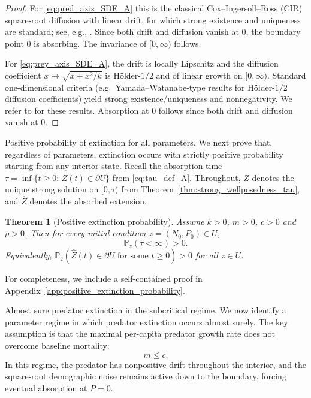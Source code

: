 \documentclass[pdflatex,sn-mathphys-ay]{sn-jnl}
\theoremstyle{thmstyleone}
\newtheorem{theorem}{Theorem}[section]
\theoremstyle{definition}
\theoremstyle{remark}
\begin{document}
\begin{proof}
For \eqref{eq:pred_axis_SDE_A} this is the classical Cox--Ingersoll--Ross (CIR) square-root diffusion with linear drift,
for which strong existence and uniqueness are standard; see, e.g.,
\citep{karatzas_brownian_1998,revuz_continuous_1999}. Since both drift and diffusion vanish at $0$,
the boundary point $0$ is absorbing. The invariance of $[0,\infty)$ follows.

For \eqref{eq:prey_axis_SDE_A}, the drift is locally Lipschitz and the diffusion coefficient $x\mapsto \sqrt{x+x^2/k}$ is H\"older-$1/2$ and of linear growth on $[0,\infty)$. Standard one-dimensional criteria (e.g.\ Yamada--Watanabe-type results for H\"older-$1/2$ diffusion coefficients) yield strong existence/uniqueness and nonnegativity. We refer to \citep{jeanblanc_mathematical_2009,revuz_continuous_1999} for these results. Absorption at $0$ follows
since both drift and diffusion vanish at $0$.
\end{proof}

Positive probability of extinction for all parameters. We next prove that, regardless of parameters, extinction occurs with strictly positive probability starting from any
interior state. Recall the absorption time $\tau=\inf\{t\ge0:\,Z(t)\in\partial U\}$ from \eqref{eq:tau_def_A}.
Throughout, $Z$ denotes the unique strong solution on $[0,\tau)$ from
Theorem~\ref{thm:strong_wellposedness_tau}, and $\widehat Z$ denotes the absorbed extension.

\begin{theorem}[Positive extinction probability]\label{thm:positive_extinction_probability}
Assume $k>0$, $m>0$, $c>0$ and $\rho>0$. Then for every initial condition $z=(N_0,P_0)\in U$,
\begin{equation}\label{eq:positive_ext_prob_A}
\mathbb{P}_z(\tau<\infty)>0.
\end{equation}
Equivalently, $\mathbb{P}_z(\widehat Z(t)\in \partial U \text{ for some }t\ge 0)>0$ for all $z\in U$.
\end{theorem}

For completeness, we include a self-contained proof in Appendix~\ref{app:positive_extinction_probability}.

Almost sure predator extinction in the subcritical regime. We now identify a parameter regime in which predator extinction occurs almost surely. The key assumption is that the
maximal per-capita predator growth rate does not overcome baseline mortality:
\begin{equation}\label{eq:subcritical_condition}
m\le c.
\end{equation}
In this regime, the predator has nonpositive drift throughout the interior, and the square-root demographic noise
remains active down to the boundary, forcing eventual absorption at $P=0$.
\end{document}

